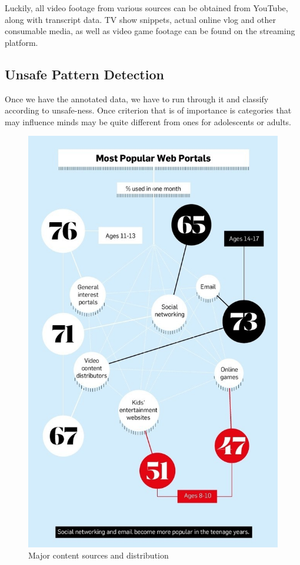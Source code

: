 \documentclass{article}[A4]
\begin{document}
Luckily, all video footage from various sources can be obtained from YouTube, along with transcript
data. TV show snippets, actual online vlog and other consumable media, as well as video game footage
can be found on the streaming platform. \\

\subsection{Unsafe Pattern Detection}

Once we have the annotated data, we have to run through it and classify according to unsafe-ness. Once
criterion that is of importance is categories that may influence minds may be quite different from ones
for adolescents or adults.

\begin{figure}[!htb]
    \centering
    \includegraphics[scale=0.25]{graphic_stats.jpg}
    \caption{Major content sources and distribution}
    \label{fig:genre_dist}
\end{figure}
\end{document}
